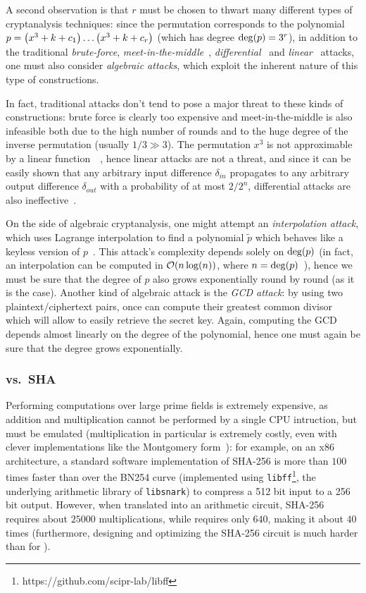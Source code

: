 A second observation is that \(r\) must be chosen to thwart many different types of cryptanalysis 
techniques: since the \Mimc{} permutation corresponds to the 
polynomial \(p = \Parens*{x^3 + k + c_1}\dots\Parens*{x^3 + k + c_r}\) 
(which has degree \(\call{\deg}{p} = 3^r\)), in addition to the traditional \emph{brute-force}, 
\emph{meet-in-the-middle}~\cite{DiffieH1977}, \emph{differential}~\cite{BihamS1991} and 
\emph{linear}~\cite{Matsui1994} attacks, one must also consider \emph{algebraic attacks}, 
which exploit the inherent nature of this type of constructions.

In fact, traditional attacks don't tend to pose a major threat to these kinds of constructions:
brute force is clearly too expensive and meet-in-the-middle is also infeasible both due to the high 
number of rounds and to the huge degree of the inverse permutation (usually \(1/3 \gg 3\)).
The permutation \(x^3\) is not approximable by a linear function~~\cite{AbdelraheemABL2012}, 
hence linear attacks are not a threat, and since it can be easily shown that any arbitrary input 
difference \(\delta_{in} \) propagates to any arbitrary output difference \(\delta_{out} \) with a 
probability of at most \({2}/{2^n}\), differential attacks are also ineffective~\cite{Nyberg1994}.

On the side of algebraic cryptanalysis, one might attempt an \emph{interpolation attack}, which 
uses Lagrange interpolation to find a polynomial \(\tilde{p}\) which behaves like a keyless version 
of \(p\)~\cite{JakobsenK1997}.
This attack's complexity depends solely on \(\call{\deg}{p}\) (in fact, an interpolation can be 
computed in \(\BigO{n\call{\log}{n}}\), where \(n = \call{\deg}{p}\)~\cite{Stoss1985}), hence we 
must be sure that the degree of \(p\) also grows exponentially round by round (as it is the case).
Another kind of algebraic attack is the \emph{GCD attack}: by using two plaintext/ciphertext pairs,
once can compute their greatest common divisor which will allow to easily retrieve the secret key.
Again, computing the GCD depends almost linearly on the degree of the polynomial, hence one must 
again be sure that the degree grows exponentially.

\subsubsection*{\Mimc{} vs.\ SHA}
Performing computations over large prime fields is extremely expensive, as addition and 
multiplication cannot be performed by a single CPU intruction, but must be emulated (multiplication 
in particular is extremely costly, even with clever implementations like the Montgomery 
form~\cite{Montgomery1985}): for example, on an x86 architecture, a standard software 
implementation of SHA-256 is more than \(100\) times faster than \Mimc{} over the BN254 curve 
(implemented using \texttt{libff}\footnote{https://github.com/scipr-lab/libff}, the underlying 
arithmetic library of \texttt{libsnark}) to compress a 512 bit input to a 256 bit output.
However, when translated into an arithmetic circuit, SHA-256 requires about \(25000\) 
multiplications, while \Mimc{} requires only \(640\), making it about \(40\) times (furthermore, 
designing and optimizing the SHA-256 circuit is much harder than for \Mimc{}). 

